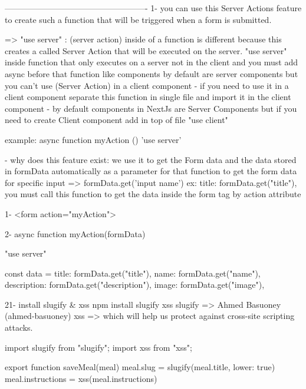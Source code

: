           ----------------------------------------------------  
    1- you can use this Server Actions feature to create such a function that will be triggered when a form is submitted.

        => "use server" : (server action)
            inside of a function is different because this creates a called Server Action that will be executed on the server.
            "use server" inside function that only executes on a server not in the client and you must add async before that function 
            like components by default are server components
            but you can't use (Server Action) in a client component
            - if you need to use it in a client component separate this function in single file and import it in the client component
            - by default components in NextJs are Server Components but if you need to create Client component add in top of file "use client"

            example: 
                async function myAction (){
                    'use server'
                }

            - why does this feature exist:
                we use it to get the Form data and the data stored in formData automatically as a parameter for that function
                to get the form data for specific input => formData.get('input name')
                  ex:  title: formData.get("title"),
                you must call this function to get the data inside the form tag by action attribute 

                1- <form action="myAction">

                2- async function myAction(formData){
                        "use server"

                        const data ={
                            title: formData.get("title"),
                            name: formData.get("name"),
                            description: formData.get("description"),
                            image: formData.get("image"),
                        }
                    }
            


21- install slugify & xss
    npm install slugify xss 
        slugify => Ahmed Basuoney (ahmed-basuoney)
        xss => which will help us protect against cross-site scripting attacks.


        import slugify from "slugify";
        import xss from "xss";


        export function saveMeal(meal) {
        meal.slug = slugify(meal.title, {lower: true})
        meal.instructions = xss(meal.instructions)
        }


